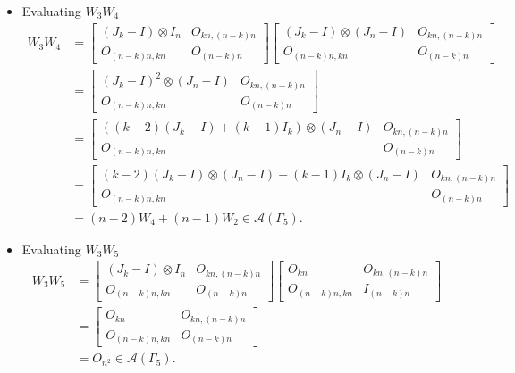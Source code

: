 \begin{itemize}
\item Evaluating $W_{3}W_{4}$
\begin{align*}
W_3W_4 &=
\begin{bmatrix}
(J_k - I) \otimes I_n & O_{kn, (n-k)n} \\
O_{(n-k)n,kn} & O_{(n-k)n}
\end{bmatrix}
\begin{bmatrix}
(J_k - I) \otimes (J_n-I) & O_{kn, (n-k)n} \\
O_{(n-k)n,kn} & O_{(n-k)n}
\end{bmatrix}\\
&= \begin{bmatrix}
(J_k - I)^2 \otimes (J_n-I) & O_{kn, (n-k)n} \\
O_{(n-k)n,kn} & O_{(n-k)n}
\end{bmatrix}\\
&= \begin{bmatrix}
((k-2)(J_k - I)+(k-1)I_k) \otimes (J_n-I) & O_{kn, (n-k)n} \\
O_{(n-k)n,kn} & O_{(n-k)n}
\end{bmatrix}\\
&= \begin{bmatrix}
(k-2)(J_k - I)\otimes (J_n-I) + (k-1)I_k\otimes (J_n-I) & O_{kn, (n-k)n} \\
O_{(n-k)n,kn} & O_{(n-k)n}
\end{bmatrix}\\
&= (n-2)W_4 + (n-1)W_2\in\mathcal{A}(\Gamma_5).
\end{align*}

\item Evaluating $W_{3}W_{5}$
\begin{align*}
W_3W_5 &=
\begin{bmatrix}
(J_k - I) \otimes I_n & O_{kn, (n-k)n} \\
O_{(n-k)n,kn} & O_{(n-k)n}
\end{bmatrix}
\begin{bmatrix}
O_{kn} & O_{kn, (n-k)n} \\
O_{(n-k)n,kn} & I_{(n - k)n}
\end{bmatrix}\\
&= \begin{bmatrix}
O_{kn} & O_{kn, (n-k)n} \\
O_{(n-k)n,kn} & O_{(n - k)n}
\end{bmatrix}\\
&= O_{n^2} \in\mathcal{A}(\Gamma_5).
\end{align*}


\end{itemize}
